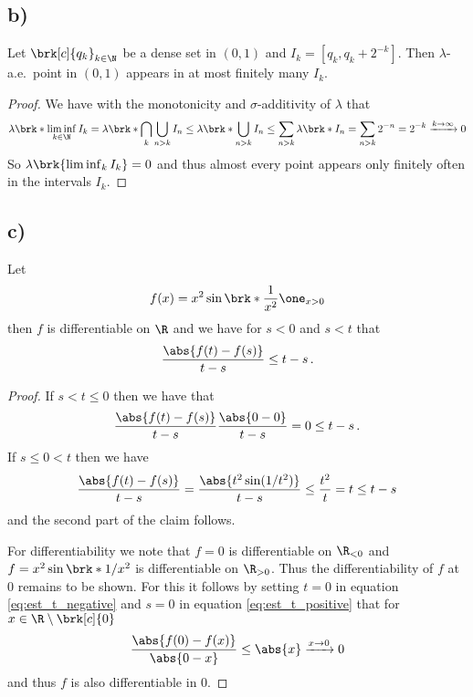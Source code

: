 \subsection{b)}
\begin{claim}
Let $\brk[c]{q_k}_{k\in\N}$ be a dense set in $(0,1)$ and $I_k=[q_k,q_k+2^{-k}]$. Then $\lambda$-a.e.\ point in $(0,1)$ appears in at most finitely many $I_k$.
\end{claim}
\begin{proof}
We have with the monotonicity and $\sigma$-additivity of $\lambda$ that
\begin{align*}
	\lambda\brk*{\liminf_{k\in\N} I_k}
	= \lambda\brk*{\bigcap_{k}\bigcup_{n> k}I_n}
	\leq \lambda\brk*{\bigcup_{n> k}I_n}
	\leq\sum_{n> k} \lambda\brk*{I_n}
	=\sum_{n> k} 2^{-n}
	=2^{-k}\xrightarrow{k\to\infty}0
\end{align*}
So $\lambda\brk{\liminf_k I_k}=0$ and thus almost every point appears only finitely often in the intervals $I_k$.
\end{proof}

\subsection{c)}
\begin{claim}
Let
\begin{align*}
	f(x)=x^2\sin\brk*{\frac{1}{x^2}}\one_{x>0}
\end{align*}
then $f$ is differentiable on $\R$ and we have for $s<0$ and $s<t$ that
\begin{align*}
	\frac{\abs{f(t)-f(s)}}{t-s}\leq t-s\,.
\end{align*}
\end{claim}
\begin{proof}
If $s<t\leq0$ then we have that
\begin{align}
	\frac{\abs{f(t)-f(s)}}{t-s}
	\frac{\abs{0-0}}{t-s}
	= 0\leq t-s\,. \label{eq:est_t_negative}
\end{align}
If $s\leq 0<t$ then we have
\begin{align}
	\frac{\abs{f(t)-f(s)}}{t-s}
	= \frac{\abs{t^2\sin (1/t^2)}}{t-s}
	\leq \frac{t^2}{t}=t\leq t-s\label{eq:est_t_positive}
\end{align}
and the second part of the claim follows.

For differentiability we note that $f=0$ is differentiable on $\R_{<0}$ and $f=x^2\sin\brk*{1/x^2}$ is differentiable on $\R_{>0}$. Thus the differentiability of $f$ at $0$ remains to be shown. For this it follows by setting $t=0$ in equation \ref{eq:est_t_negative} and $s=0$ in equation \ref{eq:est_t_positive} that for $x\in\R\setminus\brk[c]{0}$
\begin{align*}
	\frac{\abs{f(0)-f(x)}}{\abs{0-x}}\leq \abs{x}\xrightarrow{x\to0}0
\end{align*}
and thus $f$ is also differentiable in $0$.
\end{proof}

